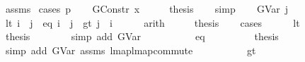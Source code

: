 \begin{isabellebody}
%
\isadelimproof
%
\endisadelimproof
%
\isatagproof
{}\isamarkupfalse%
\ assms\isanewline
{}\isamarkupfalse%
\ {\isacharparenleft}{\kern0pt}cases\ p{\isacharparenright}{\kern0pt}\isanewline
\ \ \isamarkupfalse%
\ {\isacharparenleft}{\kern0pt}GConstr\ x{}{\isacharparenright}{\kern0pt}\isanewline
\ \ \isamarkupfalse%
\ \isamarkupfalse%
\ {\isacharquery}{\kern0pt}thesis\isanewline
\ \ \isamarkupfalse%
\ simp\isanewline
{}\isamarkupfalse%
\isanewline
\ \ \isamarkupfalse%
\ {\isacharparenleft}{\kern0pt}GVar\ j{\isacharparenright}{\kern0pt}\isanewline
\ \ \isamarkupfalse%
\ {\isacharparenleft}{\kern0pt}lt{\isacharparenright}{\kern0pt}\ {\isachardoublequoteopen}i\ {\isacharless}{\kern0pt}\ j{\isachardoublequoteclose}\ {\isacharbar}{\kern0pt}\ {\isacharparenleft}{\kern0pt}eq{\isacharparenright}{\kern0pt}\ {\isachardoublequoteopen}i\ {\isacharequal}{\kern0pt}\ j{\isachardoublequoteclose}\ {\isacharbar}{\kern0pt}\ {\isacharparenleft}{\kern0pt}gt{\isacharparenright}{\kern0pt}\ {\isachardoublequoteopen}j\ {\isacharless}{\kern0pt}\ i{\isachardoublequoteclose}\isanewline
\ \ \ \ \isamarkupfalse%
\ arith\isanewline
\ \ \isamarkupfalse%
\ \isamarkupfalse%
\ {\isacharquery}{\kern0pt}thesis\isanewline
\ \ \isamarkupfalse%
\ cases\isanewline
\ \ \ \ \isamarkupfalse%
\ lt\isanewline
\ \ \ \ \ \ \isamarkupfalse%
\ \isamarkupfalse%
\ {\isacharquery}{\kern0pt}thesis\isanewline
\ \ \ \ \ \ \isamarkupfalse%
\ {\isacharparenleft}{\kern0pt}simp\ add{\isacharcolon}{\kern0pt}\ GVar{\isacharparenright}{\kern0pt}\isanewline
\ \ \ \ \isamarkupfalse%
\isanewline
\ \ \ \ \isamarkupfalse%
\ eq\isanewline
\ \ \ \ \ \ \isamarkupfalse%
\ \isamarkupfalse%
\ {\isacharquery}{\kern0pt}thesis\isanewline
\ \ \ \ \ \ \isamarkupfalse%
\ {\isacharparenleft}{\kern0pt}simp\ add{\isacharcolon}{\kern0pt}\ GVar\ assms{\isacharparenleft}{\kern0pt}{}{\isacharparenright}{\kern0pt}\ lmap{\isacharunderscore}{\kern0pt}lmap{\isacharunderscore}{\kern0pt}commute{\isacharparenright}{\kern0pt}\isanewline
\ \ \ \ \isamarkupfalse%
\isanewline
\ \ \ \ \isamarkupfalse%
\ gt\isanewline
\ \ \ \ \ \ \isamarkupfalse%

\end{isabellebody}
